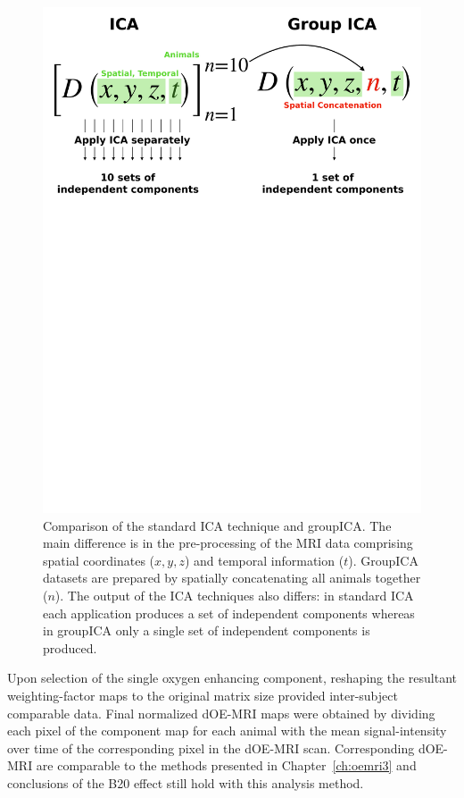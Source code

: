 \begin{figure}[htbp]
   \centering
   \includegraphics[width=\textwidth]{futurework/futurework-images/groupICA_schematic.pdf} %
   \caption{Comparison of the standard ICA technique and groupICA. The main difference is in the pre-processing of the MRI data comprising spatial coordinates ($x,y,z$) and temporal information ($t$). GroupICA datasets are prepared by spatially concatenating all animals together ($n$). The output of the ICA techniques also differs: in standard ICA each application produces a set of independent components whereas in groupICA only a single set of independent components is produced.
   \label{groupICAschematic}}
\end{figure}

Upon selection of the single oxygen enhancing component, reshaping the resultant weighting-factor maps to the original matrix size provided inter-subject comparable data.
Final normalized \acs{dOE-MRI} maps were obtained by dividing each pixel of the component map for each animal with the mean signal-intensity over time of the corresponding pixel in the dOE-MRI scan.
Corresponding \acs{dOE-MRI} are comparable to the methods presented in Chapter~\ref{ch:oemri3} and conclusions of the B20 effect still hold with this analysis method.

